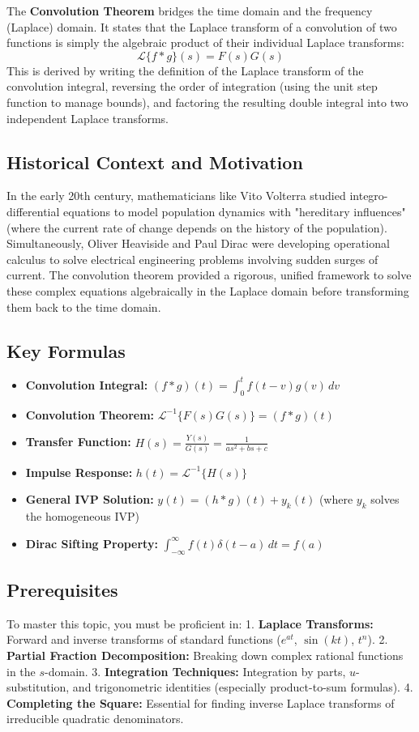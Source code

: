 \documentclass[11pt, letterpaper]{article}
\theoremstyle{definition}
\theoremstyle{remark}
\begin{document}
The \textbf{Convolution Theorem} bridges the time domain and the frequency (Laplace) domain. It states that the Laplace transform of a convolution of two functions is simply the algebraic product of their individual Laplace transforms:
\[
\mathscr{L}\{f * g\}(s) = F(s)G(s)
\]
This is derived by writing the definition of the Laplace transform of the convolution integral, reversing the order of integration (using the unit step function to manage bounds), and factoring the resulting double integral into two independent Laplace transforms.

\subsection{Historical Context and Motivation}
In the early 20th century, mathematicians like Vito Volterra studied integro-differential equations to model population dynamics with "hereditary influences" (where the current rate of change depends on the history of the population). Simultaneously, Oliver Heaviside and Paul Dirac were developing operational calculus to solve electrical engineering problems involving sudden surges of current. The convolution theorem provided a rigorous, unified framework to solve these complex equations algebraically in the Laplace domain before transforming them back to the time domain.

\subsection{Key Formulas}
\begin{itemize}
    \item \textbf{Convolution Integral:} $(f * g)(t) = \int_0^t f(t - v)g(v) \, dv$
    \item \textbf{Convolution Theorem:} $\mathscr{L}^{-1}\{F(s)G(s)\} = (f * g)(t)$
    \item \textbf{Transfer Function:} $H(s) = \frac{Y(s)}{G(s)} = \frac{1}{as^2 + bs + c}$
    \item \textbf{Impulse Response:} $h(t) = \mathscr{L}^{-1}\{H(s)\}$
    \item \textbf{General IVP Solution:} $y(t) = (h * g)(t) + y_k(t)$ (where $y_k$ solves the homogeneous IVP)
    \item \textbf{Dirac Sifting Property:} $\int_{-\infty}^{\infty} f(t)\delta(t-a) \, dt = f(a)$
\end{itemize}

\subsection{Prerequisites}
To master this topic, you must be proficient in:
1. \textbf{Laplace Transforms:} Forward and inverse transforms of standard functions ($e^{at}$, $\sin(kt)$, $t^n$).
2. \textbf{Partial Fraction Decomposition:} Breaking down complex rational functions in the $s$-domain.
3. \textbf{Integration Techniques:} Integration by parts, $u$-substitution, and trigonometric identities (especially product-to-sum formulas).
4. \textbf{Completing the Square:} Essential for finding inverse Laplace transforms of irreducible quadratic denominators.
\end{document}
